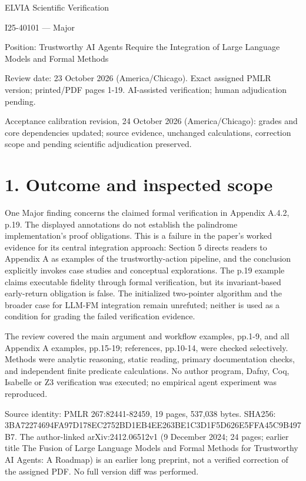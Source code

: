 \documentclass[10pt]{article}
\begin{document}
ELVIA Scientific Verification\par
I25-40101 — Major\par
Position: Trustworthy AI Agents Require the Integration of Large Language Models and Formal Methods\par
Review date: 23 October 2026 (America/Chicago). Exact assigned PMLR version; printed/PDF pages 1-19. AI-assisted verification; human adjudication pending.\par
Acceptance calibration revision, 24 October 2026 (America/Chicago): grades and core dependencies updated; source evidence, unchanged calculations, correction scope and pending scientific adjudication preserved.\par
\section*{1. Outcome and inspected scope}
One Major finding concerns the claimed formal verification in Appendix A.4.2, p.19. The displayed annotations do not establish the palindrome implementation’s proof obligations. This is a failure in the paper’s worked evidence for its central integration approach: Section 5 directs readers to Appendix A as examples of the trustworthy-action pipeline, and the conclusion explicitly invokes case studies and conceptual explorations. The p.19 example claims executable fidelity through formal verification, but its invariant-based early-return obligation is false. The initialized two-pointer algorithm and the broader case for LLM-FM integration remain unrefuted; neither is used as a condition for grading the failed verification evidence.\par
The review covered the main argument and workflow examples, pp.1-9, and all Appendix A examples, pp.15-19; references, pp.10-14, were checked selectively. Methods were analytic reasoning, static reading, primary documentation checks, and independent finite predicate calculations. No author program, Dafny, Coq, Isabelle or Z3 verification was executed; no empirical agent experiment was reproduced.\par
Source identity: PMLR 267:82441-82459, 19 pages, 537,038 bytes. SHA256: 3BA72274694FA97D178EC2752BD1EB4EE263BE1C3D1F5D626E5FFA45C9B497B7. The author-linked arXiv:2412.06512v1 (9 December 2024; 24 pages; earlier title The Fusion of Large Language Models and Formal Methods for Trustworthy AI Agents: A Roadmap) is an earlier long preprint, not a verified correction of the assigned PDF. No full version diff was performed.\par
\end{document}
